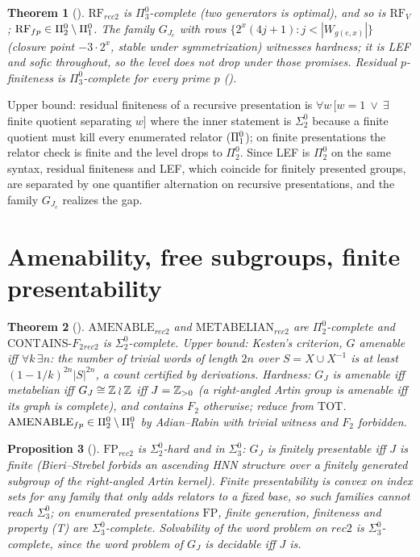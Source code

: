 \documentclass[11pt]{article}
\newtheorem{theorem}{Theorem}[section]
\newtheorem{proposition}[theorem]{Proposition}
\theoremstyle{definition}
\newcommand{\Pizt}{\Pi^0_2}\newcommand{\Sizt}{\Sigma^0_2}\newcommand{\Pith}{\Pi^0_3}\newcommand{\Sith}{\Sigma^0_3}
\begin{document}
\begin{theorem}[]
$\mathrm{RF}_{rec2}$ is $\Pith$-complete (two generators is optimal), and so is $\mathrm{RF}_V$; $\mathrm{RF}_{fp}\in\Pizt\setminus\Pio$. The family $G_{J_e}$ with rows $\{2^x(4j+1):j<|W_{g(e,x)}|\}$ (closure point $-3\cdot2^x$, stable under symmetrization) witnesses hardness; it is LEF and sofic throughout, so the level does not drop under those promises. Residual $p$-finiteness is $\Pith$-complete for every prime $p$ ().
\end{theorem}
Upper bound: residual finiteness of a recursive presentation is $\forall w\,[w=1\ \vee\ \exists$ finite quotient separating $w]$ where the inner statement is $\Sizt$ because a finite quotient must kill every enumerated relator ($\Pi^0_1$); on finite presentations the relator check is finite and the level drops to $\Pizt$. Since LEF is $\Pizt$ on the same syntax, residual finiteness and LEF, which coincide for finitely presented groups, are separated by one quantifier alternation on recursive presentations, and the family $G_{J_e}$ realizes the gap.

\section{Amenability, free subgroups, finite presentability}
\begin{theorem}[]
$\mathrm{AMENABLE}_{rec2}$ and $\mathrm{METABELIAN}_{rec2}$ are $\Pizt$-complete and $\mathrm{CONTAINS}\text{-}F_2{}_{rec2}$ is $\Sizt$-complete. Upper bound: Kesten's criterion, $G$ amenable iff $\forall k\,\exists n$: the number of trivial words of length $2n$ over $S=X\cup X^{-1}$ is at least $(1-1/k)^{2n}|S|^{2n}$, a count certified by derivations. Hardness: $G_J$ is amenable iff metabelian iff $G_J\cong\mathbb Z\wr\mathbb Z$ iff $J=\mathbb Z_{>0}$ (a right-angled Artin group is amenable iff its graph is complete), and contains $F_2$ otherwise; reduce from $\mathrm{TOT}$. $\mathrm{AMENABLE}_{fp}\in\Pizt\setminus\Pio$ by Adian--Rabin with trivial witness and $F_2$ forbidden.
\end{theorem}
\begin{proposition}[]
$\mathrm{FP}_{rec2}$ is $\Sizt$-hard and in $\Sith$: $G_J$ is finitely presentable iff $J$ is finite (Bieri--Strebel forbids an ascending HNN structure over a finitely generated subgroup of the right-angled Artin kernel). Finite presentability is convex on index sets for any family that only adds relators to a fixed base, so such families cannot reach $\Sith$; on enumerated presentations $\mathrm{FP}$, finite generation, finiteness and property (T) are $\Sith$-complete. Solvability of the word problem on $rec2$ is $\Sith$-complete, since the word problem of $G_J$ is decidable iff $J$ is.
\end{proposition}
\end{document}
